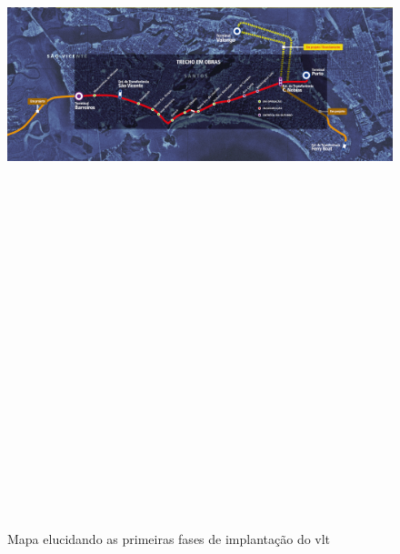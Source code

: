	\begin{landscape}
		\begin{figure}[p]
			\centering
			\caption{Mapa elucidando as primeiras fases de implantação do \gls{vlt}}
			\includegraphics[width=25cm,height=25cm,keepaspectratio]{img/tracado-vlt.jpg}
			\label{mapa_vlt}
		\end{figure}
	\end{landscape}
	
